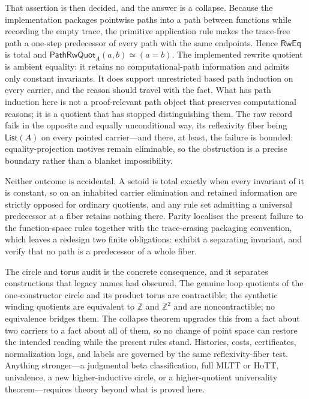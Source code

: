 \documentclass[10pt,reqno]{amsart}
\newcommand{\Eqv}{\simeq}
\newcommand{\List}{\mathsf{List}}
\newcommand{\PRW}{\mathsf{PathRwQuot}}
\begin{document}
That assertion is then decided, and the answer is a collapse.  Because the
implementation packages pointwise paths into a path between functions while
recording the empty trace, the primitive application rule makes the trace-free
path a one-step predecessor of every path with the same endpoints.  Hence
\(\mathsf{RwEq}\) is total and \(\PRW_A(a,b)\Eqv(a=b)\).  The implemented
rewrite quotient is ambient equality: it retains no computational-path
information and admits only constant invariants.  It does support unrestricted
based path induction on every carrier, and the reason should travel with the
fact.  What has path induction here is not a proof-relevant path object that
preserves computational reasons; it is a quotient that has stopped
distinguishing them.  The raw record fails in the opposite and equally
unconditional way, its reflexivity fiber being \(\List(A)\) on every pointed
carrier---and there, at least, the failure is bounded: equality-projection
motives remain eliminable, so the obstruction is a precise boundary rather than
a blanket impossibility.

Neither outcome is accidental.  A setoid is total exactly when every invariant
of it is constant, so on an inhabited carrier elimination and retained
information are strictly opposed for ordinary quotients, and any rule set
admitting a universal predecessor at a fiber retains nothing there.  Parity
localises the present failure to the function-space rules together with the
trace-erasing packaging convention, which leaves a redesign two finite
obligations: exhibit a separating invariant, and verify that no path is a
predecessor of a whole fiber.

The circle and torus audit is the concrete consequence, and it separates
constructions that legacy names had obscured.  The genuine loop quotients of the
one-constructor circle and its product torus are contractible; the synthetic
winding quotients are equivalent to \(\mathbb Z\) and \(\mathbb Z^2\) and are
noncontractible; no equivalence bridges them.  The collapse theorem upgrades
this from a fact about two carriers to a fact about all of them, so no change of
point space can restore the intended reading while the present rules stand.
Histories, costs, certificates, normalization logs, and labels are governed by
the same reflexivity-fiber test.  Anything stronger---a judgmental beta
classification, full MLTT or HoTT, univalence, a new higher-inductive circle, or
a higher-quotient universality theorem---requires theory beyond what is proved
here.
\end{document}
